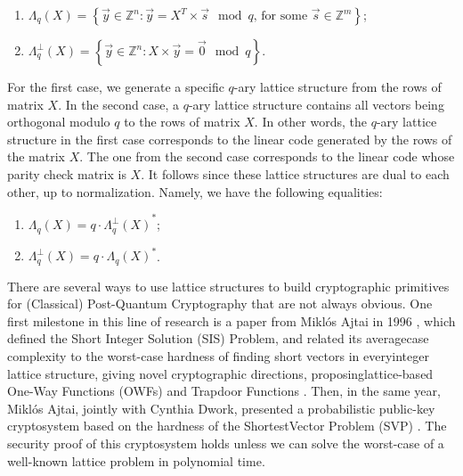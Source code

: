 \documentclass[runningheads]{llncs}
\numberwithin{equation}{section}
\begin{document}
    \begin{enumerate}
        \item ${\Lambda}_{q}(X) = \left\{ \Vec{y} \in {\mathbb{Z}}^{n}: \Vec{y} = {X}^{T} \times \Vec{s} \mod q\text{, for some } \Vec{s}\in {\mathbb{Z}}^{m} \right\}$;
        \item ${\Lambda}_{q}^{\perp}(X) = \left\{ \Vec{y} \in {\mathbb{Z}}^{n}: X \times \Vec{y} = \Vec{0} \mod q \right\}$.
    \end{enumerate}

    \noindent For the first case, we generate a specific $q$-ary lattice structure from the rows of matrix $X$. In the second case, a $q$-ary lattice structure contains all vectors being orthogonal modulo $q$ to the rows of matrix $X$. In other words, the $q$-ary lattice structure in the first case corresponds to the linear code generated by the rows of the matrix $X$. The one from the second case corresponds to the linear code whose parity check matrix is $X$. It follows since these lattice structures are dual to each other, up to normalization. Namely, we have the following equalities:
    
    \begin{enumerate}
        \item ${\Lambda}_{q}(X) = q \cdot {{\Lambda}_{q}^{\perp}(X)}^{*}$;
        \item ${\Lambda}_{q}^{\perp}(X) = q \cdot {{\Lambda}_{q}(X)}^{*}$.
    \end{enumerate}

    \noindent There are several ways to use lattice structures to build cryptographic primitives for (Classical) Post-Quantum Cryptography that are not always obvious. One first milestone in this line of research is a paper from Mikl\'{o}s Ajtai in 1996 \cite{ajtai:generating-hard-instances-lattice-problems:1996:06-2024,ajtai:shortest-vector-problem-l2-np-hard-randomized-reductions:1998:06-2024}, which defined the Short Integer Solution (SIS) Problem, and related its average\break case complexity to the worst-case hardness of finding short vectors in every\break integer lattice structure, giving novel cryptographic directions, proposing\break lattice-based One-Way Functions (OWFs) \cite{micciancio:generalized-compact-knapsacks-cyclic-lattices-efficient-one-way-functions:2007:06-2024} and Trapdoor Functions \cite{gentry-peikert-vaikuntanathan:trapdoors-hard-lattices-and-new-cryptographic-constructions:2007:06-2024}. Then, in the same year, Mikl\'{o}s Ajtai, jointly with Cynthia Dwork, presented a probabilistic public-key cryptosystem based on the hardness of the Shortest\break Vector Problem (SVP) \cite{ajtai-dwork:public-key-cryptosystem-with-worst-case-average-case-equivalence:1997:06-2024}. The security proof of this cryptosystem holds unless we can solve the worst-case of a well-known lattice problem in polynomial time.
\end{document}
